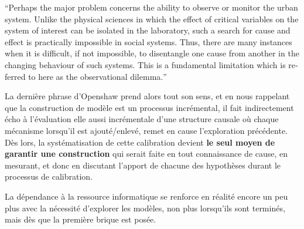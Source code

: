 \foreignquote{english}{Perhaps the major problem concerns the ability to observe or monitor the urban system. Unlike the physical sciences in which the effect of critical variables on the system of interest can be isolated in the laboratory, such a search for cause and effect is practically impossible in social systems. Thus, there are many instances when it is difficult, if not impossible, to disentangle one cause from another in the changing behaviour of such systems. This is a fundamental limitation which is referred to here as the observational dilemma.}

La dernière phrase d'Openshaw prend alors tout son sens, et en nous rappelant que la construction de modèle est un processus incrémental, il fait indirectement écho à l'évaluation elle aussi incrémentale d'une structure causale où chaque mécanisme lorsqu'il est ajouté/enlevé, remet en cause l'exploration précédente. Dès lors, la systématisation de cette calibration devient \textbf{le seul moyen de garantir une construction} qui serait faite en tout connaissance de cause, en mesurant, et donc en discutant l'apport de chacune des hypothèses durant le processus de calibration.

La dépendance à la ressource informatique se renforce en réalité encore un peu plus avec la nécessité d'explorer les modèles, non plus lorsqu'ils sont terminés, mais dès que la première brique est posée. 




